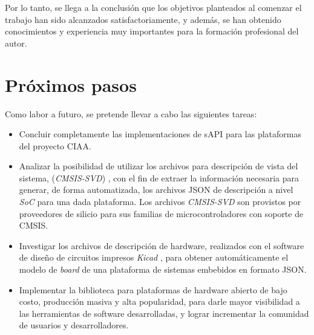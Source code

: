 Por lo tanto, se llega a la conclusión que los objetivos planteados al comenzar el trabajo han sido alcanzados satisfactoriamente, y además, se han obtenido conocimientos y experiencia muy importantes para la formación profesional del autor.

\section{Próximos pasos}

Como labor a futuro, se pretende llevar a cabo las siguientes tareas:

\begin{itemize}
\item
Concluir completamente las implementaciones de sAPI para las plataformas del proyecto CIAA.
\item
Analizar la posibilidad de utilizar los archivos para descripción de vista del sistema, (\emph{CMSIS-SVD}) \citep{CMSISSVD}, con el fin de extraer la información necesaria para generar, de forma automatizada, los archivos JSON de descripción a nivel \emph{SoC} para una dada plataforma. Los archivos \emph{CMSIS-SVD} son provistos por proveedores de silicio para sus familias de microcontroladores con soporte de CMSIS.
\item
Investigar los archivos de descripción de hardware, realizados con el software de diseño de circuitos impresos \emph{Kicad} \citep{Kicad}, para obtener automáticamente el modelo de \emph{board} de una plataforma de sistemas embebidos en formato JSON.
\item
Implementar la biblioteca para plataformas de hardware abierto de bajo costo, producción masiva y alta popularidad, para darle mayor visibilidad a las herramientas de software desarrolladas, y lograr incrementar la comunidad de usuarios y desarrolladores.
\end{itemize}
